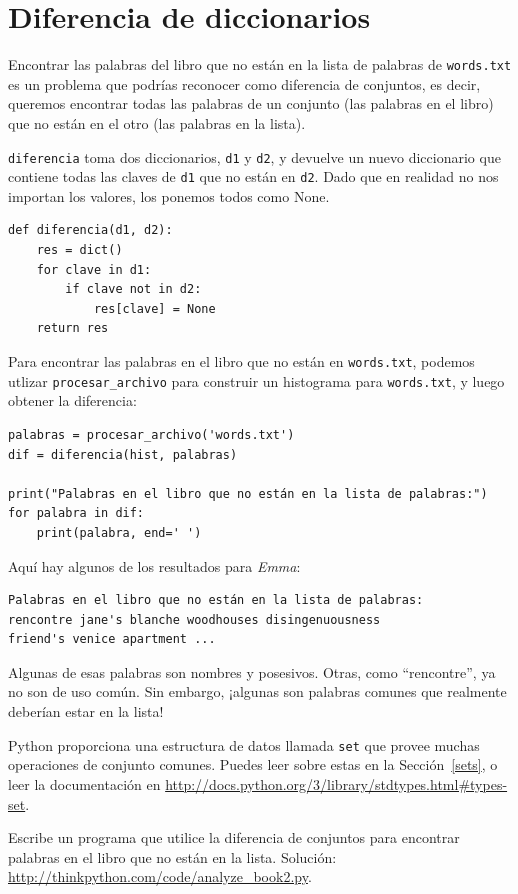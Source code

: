 \documentclass[10pt]{book}
\begin{document}
\section{Diferencia de diccionarios}
\label{dictsub}

Encontrar las palabras del libro que no están en la lista de palabras
de {\tt words.txt} es un problema que podrías reconocer como diferencia
de conjuntos, es decir, queremos encontrar todas las palabras de un
conjunto (las palabras en el libro) que no están en el otro (las
palabras en la lista).

{\tt diferencia} toma dos diccionarios, {\tt d1} y {\tt d2}, y devuelve un
nuevo diccionario que contiene todas las claves de {\tt d1} que no están
en {\tt d2}.  Dado que en realidad no nos importan los valores,
los ponemos todos como None.

\begin{verbatim}
def diferencia(d1, d2):
    res = dict()
    for clave in d1:
        if clave not in d2:
            res[clave] = None
    return res
\end{verbatim}
%
Para encontrar las palabras en el libro que no están en {\tt words.txt},
podemos utlizar \verb"procesar_archivo" para construir un histograma para
{\tt words.txt}, y luego obtener la diferencia:

\begin{verbatim}
palabras = procesar_archivo('words.txt')
dif = diferencia(hist, palabras)

print("Palabras en el libro que no están en la lista de palabras:")
for palabra in dif:
    print(palabra, end=' ')
\end{verbatim}
%
Aquí hay algunos de los resultados para {\em Emma}:

\begin{verbatim}
Palabras en el libro que no están en la lista de palabras:
rencontre jane's blanche woodhouses disingenuousness
friend's venice apartment ...
\end{verbatim}
%
Algunas de esas palabras son nombres y posesivos.  Otras, como
``rencontre'', ya no son de uso común.  Sin embargo, ¡algunas son
palabras comunes que realmente deberían estar en la lista!

\begin{exercise}

Python proporciona una estructura de datos llamada {\tt set} que provee muchas
operaciones de conjunto comunes.  Puedes leer sobre estas en la Sección~\ref{sets},
o leer la documentación en
\url{http://docs.python.org/3/library/stdtypes.html#types-set}.

Escribe un programa que utilice la diferencia de conjuntos para encontrar palabras en el libro
que no están en la lista.  Solución:
\url{http://thinkpython.com/code/analyze_book2.py}.

\end{exercise}
\end{document}
